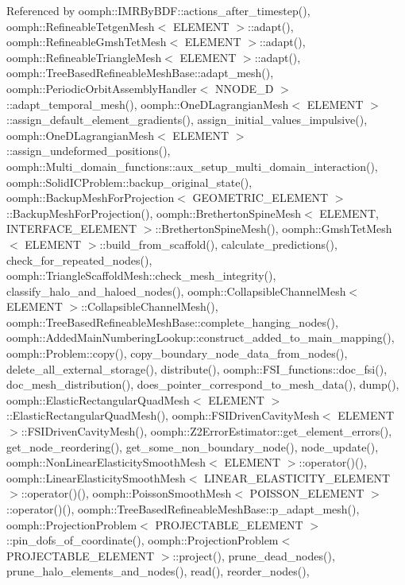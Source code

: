 Referenced by oomph\+::\+I\+M\+R\+By\+B\+D\+F\+::actions\+\_\+after\+\_\+timestep(), oomph\+::\+Refineable\+Tetgen\+Mesh$<$ E\+L\+E\+M\+E\+N\+T $>$\+::adapt(), oomph\+::\+Refineable\+Gmsh\+Tet\+Mesh$<$ E\+L\+E\+M\+E\+N\+T $>$\+::adapt(), oomph\+::\+Refineable\+Triangle\+Mesh$<$ E\+L\+E\+M\+E\+N\+T $>$\+::adapt(), oomph\+::\+Tree\+Based\+Refineable\+Mesh\+Base\+::adapt\+\_\+mesh(), oomph\+::\+Periodic\+Orbit\+Assembly\+Handler$<$ N\+N\+O\+D\+E\+\_\+D $>$\+::adapt\+\_\+temporal\+\_\+mesh(), oomph\+::\+One\+D\+Lagrangian\+Mesh$<$ E\+L\+E\+M\+E\+N\+T $>$\+::assign\+\_\+default\+\_\+element\+\_\+gradients(), assign\+\_\+initial\+\_\+values\+\_\+impulsive(), oomph\+::\+One\+D\+Lagrangian\+Mesh$<$ E\+L\+E\+M\+E\+N\+T $>$\+::assign\+\_\+undeformed\+\_\+positions(), oomph\+::\+Multi\+\_\+domain\+\_\+functions\+::aux\+\_\+setup\+\_\+multi\+\_\+domain\+\_\+interaction(), oomph\+::\+Solid\+I\+C\+Problem\+::backup\+\_\+original\+\_\+state(), oomph\+::\+Backup\+Mesh\+For\+Projection$<$ G\+E\+O\+M\+E\+T\+R\+I\+C\+\_\+\+E\+L\+E\+M\+E\+N\+T $>$\+::\+Backup\+Mesh\+For\+Projection(), oomph\+::\+Bretherton\+Spine\+Mesh$<$ E\+L\+E\+M\+E\+N\+T, I\+N\+T\+E\+R\+F\+A\+C\+E\+\_\+\+E\+L\+E\+M\+E\+N\+T $>$\+::\+Bretherton\+Spine\+Mesh(), oomph\+::\+Gmsh\+Tet\+Mesh$<$ E\+L\+E\+M\+E\+N\+T $>$\+::build\+\_\+from\+\_\+scaffold(), calculate\+\_\+predictions(), check\+\_\+for\+\_\+repeated\+\_\+nodes(), oomph\+::\+Triangle\+Scaffold\+Mesh\+::check\+\_\+mesh\+\_\+integrity(), classify\+\_\+halo\+\_\+and\+\_\+haloed\+\_\+nodes(), oomph\+::\+Collapsible\+Channel\+Mesh$<$ E\+L\+E\+M\+E\+N\+T $>$\+::\+Collapsible\+Channel\+Mesh(), oomph\+::\+Tree\+Based\+Refineable\+Mesh\+Base\+::complete\+\_\+hanging\+\_\+nodes(), oomph\+::\+Added\+Main\+Numbering\+Lookup\+::construct\+\_\+added\+\_\+to\+\_\+main\+\_\+mapping(), oomph\+::\+Problem\+::copy(), copy\+\_\+boundary\+\_\+node\+\_\+data\+\_\+from\+\_\+nodes(), delete\+\_\+all\+\_\+external\+\_\+storage(), distribute(), oomph\+::\+F\+S\+I\+\_\+functions\+::doc\+\_\+fsi(), doc\+\_\+mesh\+\_\+distribution(), does\+\_\+pointer\+\_\+correspond\+\_\+to\+\_\+mesh\+\_\+data(), dump(), oomph\+::\+Elastic\+Rectangular\+Quad\+Mesh$<$ E\+L\+E\+M\+E\+N\+T $>$\+::\+Elastic\+Rectangular\+Quad\+Mesh(), oomph\+::\+F\+S\+I\+Driven\+Cavity\+Mesh$<$ E\+L\+E\+M\+E\+N\+T $>$\+::\+F\+S\+I\+Driven\+Cavity\+Mesh(), oomph\+::\+Z2\+Error\+Estimator\+::get\+\_\+element\+\_\+errors(), get\+\_\+node\+\_\+reordering(), get\+\_\+some\+\_\+non\+\_\+boundary\+\_\+node(), node\+\_\+update(), oomph\+::\+Non\+Linear\+Elasticity\+Smooth\+Mesh$<$ E\+L\+E\+M\+E\+N\+T $>$\+::operator()(), oomph\+::\+Linear\+Elasticity\+Smooth\+Mesh$<$ L\+I\+N\+E\+A\+R\+\_\+\+E\+L\+A\+S\+T\+I\+C\+I\+T\+Y\+\_\+\+E\+L\+E\+M\+E\+N\+T $>$\+::operator()(), oomph\+::\+Poisson\+Smooth\+Mesh$<$ P\+O\+I\+S\+S\+O\+N\+\_\+\+E\+L\+E\+M\+E\+N\+T $>$\+::operator()(), oomph\+::\+Tree\+Based\+Refineable\+Mesh\+Base\+::p\+\_\+adapt\+\_\+mesh(), oomph\+::\+Projection\+Problem$<$ P\+R\+O\+J\+E\+C\+T\+A\+B\+L\+E\+\_\+\+E\+L\+E\+M\+E\+N\+T $>$\+::pin\+\_\+dofs\+\_\+of\+\_\+coordinate(), oomph\+::\+Projection\+Problem$<$ P\+R\+O\+J\+E\+C\+T\+A\+B\+L\+E\+\_\+\+E\+L\+E\+M\+E\+N\+T $>$\+::project(), prune\+\_\+dead\+\_\+nodes(), prune\+\_\+halo\+\_\+elements\+\_\+and\+\_\+nodes(), read(), reorder\+\_\+nodes(), 
